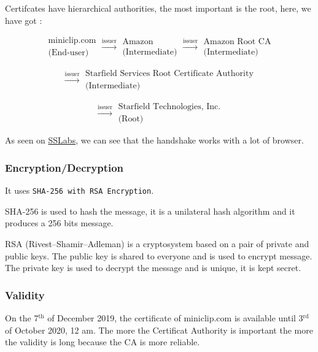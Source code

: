 \documentclass{article}
\begin{document}
Certifcates have hierarchical authorities, the most important is the root, here, we have got :

\[
    \begin{array}{c}
        \text{miniclip.com}\\\text{(End-user)}
    \end{array}
    \xrightarrow[]{\text{issuer}}
    \begin{array}{c}
        \text{Amazon}\\\text{(Intermediate)}
    \end{array}
    \xrightarrow[]{\text{issuer}}
    \begin{array}{c}
        \text{Amazon Root CA}\\\text{(Intermediate)}
    \end{array}
\]

\[    
    \xrightarrow[]{\text{issuer}}
    \begin{array}{c}
        \text{Starfield Services Root Certificate Authority}\\\text{(Intermediate)}
    \end{array}
\]

\[     
    \xrightarrow[]{\text{issuer}}
    \begin{array}{c}
        \text{Starfield Technologies, Inc.}\\\text{(Root)}
    \end{array}
\]

As seen on \href{https://www.ssllabs.com/ssltest/analyze.html?d=miniclip.com&s=99.84.224.21}{SSLabs}, we can see that the handshake works with a lot of browser.


\subsubsection{Encryption/Decryption}
It uses \texttt{SHA-256 with RSA Encryption}.

SHA-256 is used to hash the message, it is a unilateral hash algorithm and it produces a 256 bits message.

RSA (Rivest–Shamir–Adleman) is a cryptosystem based on a pair of private and public keys. The public key is shared to everyone and is used to encrypt message. The private key is used to decrypt the message and is unique, it is kept secret.


\subsubsection{Validity}

On the 7$^{\text{th}}$ of December 2019, the certificate of miniclip.com is available until 3$^{\text{rd}}$ of October 2020, 12 am. The more the Certificat Authority is important the more the validity is long because the CA is more reliable.




\end{document}
